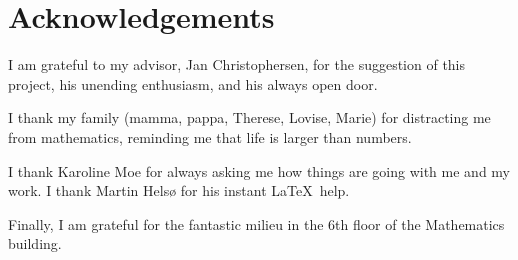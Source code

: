 \chapter{Acknowledgements}


I am grateful to my advisor, Jan Christophersen, for the suggestion of this project, his unending enthusiasm, and his always open door.

I thank my family (mamma, pappa, Therese, Lovise, Marie) for distracting me from mathematics, reminding me that life is larger than numbers.

I thank Karoline Moe for always asking me how things are going with me and my work. I thank Martin Helsø for his instant \LaTeX\, help.

Finally, I am grateful for the fantastic milieu in the 6th floor of the Mathematics building. 